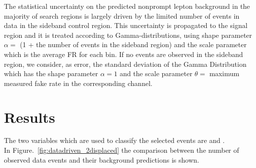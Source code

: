 The statistical uncertainty on the predicted nonprompt lepton background
in the majority of search regions is largely driven by the limited
number of events in data in the sideband control region. This uncertainty
is propagated to the signal region and it is treated according to Gamma-distributions, using shape parameter $\alpha =$ (1 +  the number of events in the sideband region) and the scale parameter which is the average FR for each bin.
If no events are observed in the sideband region, we consider, as error, the standard deviation of the Gamma Distribution which has the shape parameter $\alpha = 1$ and the scale parameter $\theta =$ maximum measured fake rate in the corresponding channel.  

\clearpage
\section{Results}\label{sec:llresults}
The two variables which are used to classify the selected events are \Deltwod and
\mtwol.\\
In Figure.~\ref{fig:datadriven_2displaced}
the comparison between the number of observed data events and their background
predictions is shown.


